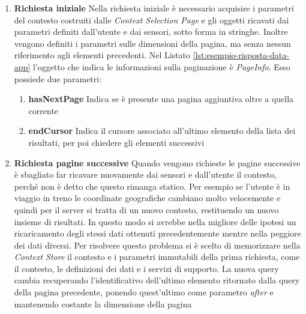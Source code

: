 \begin{enumerate}
	\item \textbf{Richiesta iniziale}
	Nella richiesta iniziale è necessario acquisire i parametri del contesto costruiti dalle \emph{Context Selection Page} e gli oggetti ricavati dai parametri definiti dall'utente e dai sensori, sotto forma in stringhe. Inoltre vengono definiti i parametri sulle dimensioni della pagina, ma senza nessun riferimento agli elementi precedenti.
	Nel Listato \ref{lst:esempio-risposta-data-app} l'oggetto che indica le informazioni sulla paginazione è \emph{PageInfo}. Esso possiede due parametri:
	\begin{enumerate}
		\item \textbf{hasNextPage}
		Indica se è presente una pagina aggiuntiva oltre a quella corrente
		\item \textbf{endCursor}
		Indica il cursore associato all'ultimo elemento della lista dei risultati, per poi chiedere gli elementi successivi
	\end{enumerate}
	\item \textbf{Richiesta pagine successive}
	Quando vengono richieste le pagine successive è sbagliato far ricavare nuovamente dai sensori e dall'utente il contesto, perché non è detto che questo rimanga statico. Per esempio se l'utente è in viaggio in treno le coordinate geografiche cambiano molto velocemente e quindi per il server si tratta di un nuovo contesto, restituendo un nuovo insieme di risultati. In questo modo si avrebbe nella migliore delle ipotesi un ricaricamento degli stessi dati ottenuti precedentemente mentre nella peggiore dei dati diversi. Per risolvere questo problema si è scelto di memorizzare nella \emph{Context Store} il contesto e i parametri immutabili della prima richiesta, come il contesto, le definizioni dei dati e i servizi di supporto. La nuova query cambia recuperando l'identificativo dell'ultimo elemento ritornato dalla query della pagina precedente, ponendo quest'ultimo come parametro \emph{after} e mantenendo costante la dimensione della pagina
\end{enumerate} 

